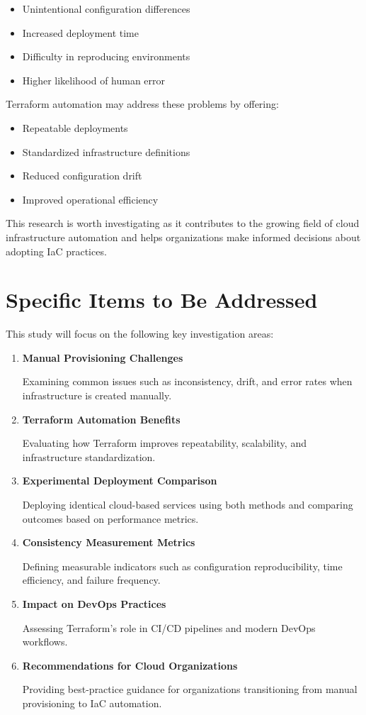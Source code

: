 \documentclass{article}
\begin{document}
\begin{itemize}
    \item Unintentional configuration differences
    \item Increased deployment time
    \item Difficulty in reproducing environments
    \item Higher likelihood of human error
\end{itemize}
Terraform automation may address these problems by offering:

\begin{itemize}
    \item Repeatable deployments
    \item Standardized infrastructure definitions
    \item Reduced configuration drift
    \item Improved operational efficiency
\end{itemize}
This research is worth investigating as it contributes to the growing field of cloud infrastructure automation and helps organizations make informed decisions about adopting IaC practices.

\section{Specific Items to Be Addressed}
This study will focus on the following key investigation areas:

\begin{enumerate}
    \item \textbf{Manual Provisioning Challenges}

 Examining common issues such as inconsistency, drift, and error rates when infrastructure is created manually.
    \item \textbf{Terraform Automation Benefits}

 Evaluating how Terraform improves repeatability, scalability, and infrastructure standardization.
    \item \textbf{Experimental Deployment Comparison}

 Deploying identical cloud-based services using both methods and comparing outcomes based on performance metrics.
    \item \textbf{Consistency Measurement Metrics}

 Defining measurable indicators such as configuration reproducibility, time efficiency, and failure frequency.
    \item \textbf{Impact on DevOps Practices}

 Assessing Terraform’s role in CI/CD pipelines and modern DevOps workflows.
    \item \textbf{Recommendations for Cloud Organizations}

 Providing best-practice guidance for organizations transitioning from manual provisioning to IaC automation.
\end{enumerate}





\end{document}
